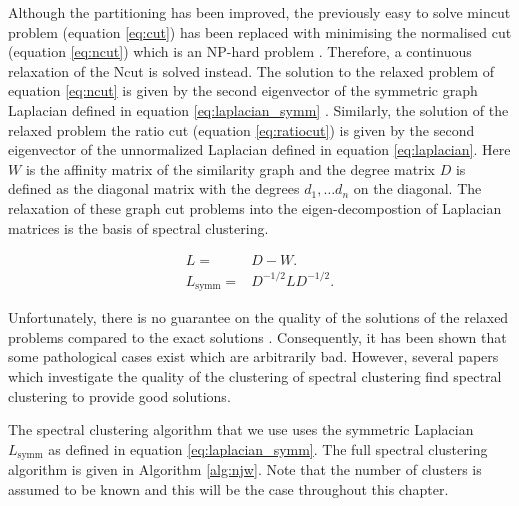 Although the partitioning has been improved, the previously easy to solve mincut problem (equation \ref{eq:cut}) has been replaced with minimising the normalised cut (equation \ref{eq:ncut}) which is an NP-hard problem \citep{Wagner1993}. Therefore,  a continuous relaxation of the Ncut is solved instead. The solution to the relaxed problem of equation \eqref{eq:ncut} is given by the second eigenvector of the symmetric graph Laplacian defined in equation \eqref{eq:laplacian_symm} \citep{Luxburg2008}. Similarly, the solution of the relaxed problem the ratio cut (equation \ref{eq:ratiocut}) is given by the second eigenvector of the unnormalized Laplacian defined in equation \eqref{eq:laplacian}. Here $W$ is the affinity matrix of the similarity graph and the degree matrix $D$ is defined as the diagonal matrix with the degrees $d_1, \ldots d_n$ on the diagonal. The relaxation of these graph cut problems into the eigen-decompostion of Laplacian matrices is the basis of spectral clustering. 

\begin{eqnarray}
\label{eq:laplacian}
 L =& D - W.\\
\label{eq:laplacian_symm}
 L_{\text{symm}} =& D^{-1/2}LD^{-1/2}. 
\end{eqnarray}


Unfortunately, there is no guarantee on the quality of the solutions of the relaxed problems compared to the exact solutions \citep{chung1997spectral}. Consequently, it has been shown that some pathological cases exist which are arbitrarily bad. However, several papers which investigate the quality of the clustering of spectral clustering \citep{Spielman1996, Kannan2004} find spectral clustering to provide good solutions. 

The spectral clustering algorithm that we use \citep{Ng2001} uses the symmetric Laplacian  $L_{\text{symm}}$ as defined in equation \ref{eq:laplacian_symm}. The full spectral clustering algorithm is given in Algorithm \ref{alg:njw}. Note that the number of clusters is assumed to be known and this will be the case throughout this chapter.


